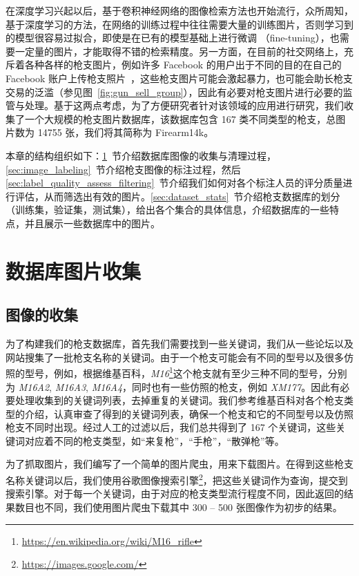 在深度学习兴起以后，基于卷积神经网络的图像检索方法也开始流行，众所周知，基于深度学习的方法，在网络的训练过程中往往需要大量的训练图片，否则学习到的模型很容易过拟合，即使是在已有的模型基础上进行微调 （fine-tuning），也需要一定量的图片，才能取得不错的检索精度。另一方面，在目前的社交网络上，充斥着各种各样的枪支图片，例如许多 Facebook 的用户出于不同的目的在自己的 Facebook 账户上传枪支照片~\cite{Drange2016,MELE2016FacebookBG}，这些枪支图片可能会激起暴力，也可能会助长枪支交易的泛滥（参见图~\ref{fig:gun_sell_group}），因此有必要对枪支图片进行必要的监管与处理。基于这两点考虑，为了方便研究者针对该领域的应用进行研究，我们收集了一个大规模的枪支图片数据库，该数据库包含 167 类不同类型的枪支，总图片数为 14755 张，我们将其简称为 Firearm14k。

本章的结构组织如下：\ref{sec:image_collect_clean}~节介绍数据库图像的收集与清理过程，\ref{sec:image_labeling}~节介绍枪支图像的标注过程，然后 \ref{sec:label_quality_assess_filtering}~节介绍我们如何对各个标注人员的评分质量进行评估，从而筛选出有效的图片。\ref{sec:dataset_stats}~节介绍枪支数据库的划分（训练集，验证集，测试集），给出各个集合的具体信息，介绍数据库的一些特点，并且展示一些数据库中的图片。


\section{数据库图片收集}\label{sec:image_collect_clean}

\subsection{图像的收集}
为了构建我们的枪支数据库，首先我们需要找到一些关键词，我们从一些论坛以及网站搜集了一批枪支名称的关键词。由于一个枪支可能会有不同的型号以及很多仿照的型号，例如，根据维基百科，\emph{M16}\footnote{\url{https://en.wikipedia.org/wiki/M16_rifle}}这个枪支就有至少三种不同的型号，分别为 \emph{M16A2}, \emph{M16A3}, \emph{M16A4}，同时也有一些仿照的枪支，例如 \emph{XM177}。因此有必要处理收集到的关键词列表，去掉重复的关键词。我们参考维基百科对各个枪支类型的介绍，认真审查了得到的关键词列表，确保一个枪支和它的不同型号以及仿照枪支不同时出现。经过人工的过滤以后，我们总共得到了 167 个关键词，这些关键词对应着不同的枪支类型，如“来复枪”，“手枪”，“散弹枪”等。

为了抓取图片，我们编写了一个简单的图片爬虫，用来下载图片。在得到这些枪支名称关键词以后，我们使用谷歌图像搜索引擎\footnote{\url{https://images.google.com/}}，把这些关键词作为查询，提交到搜索引擎。对于每一个关键词，由于对应的枪支类型流行程度不同，因此返回的结果数目也不同，我们使用图片爬虫下载其中 300 -- 500 张图像作为初步的结果。

